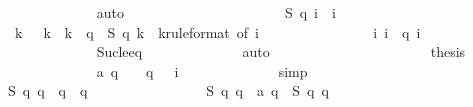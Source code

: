 \begin{isabellebody}
\ \ \ \ \ \ \ \ \ \ \ \ \isamarkupfalse%
\ auto\isanewline
\ \ \ \ \ \ \ \ \ \ \isamarkupfalse%
\isanewline
\ \ \ \ \ \ \ \ \ \ \isamarkupfalse%
\ {\isachardoublequoteopen}{\isacharquery}S\ q\ {\isacharparenleft}i{\isacharminus}{}{\isacharparenright}\ {\isacharequal}\ {\isacharparenleft}i{\isacharminus}{}{\isacharparenright}{\isachardoublequoteclose}\isanewline
\ \ \ \ \ \ \ \ \ \ \ \ \isamarkupfalse%
\ {\isacharbackquoteopen}{\isasymforall}\ k{\isachardot}\ {}\ {\isasymle}\ k\ {\isasymand}\ k\ {\isacharless}\ q\ {\isasymlongrightarrow}\ {\isacharquery}S\ q\ k\ {\isacharequal}\ k{\isacharbackquoteclose}{\isacharbrackleft}rule{\isacharunderscore}format{\isacharcomma}\ of\ {\isachardoublequoteopen}i{\isacharminus}{}{\isachardoublequoteclose}{\isacharbrackright}\isanewline
\ \ \ \ \ \ \ \ \ \ \ \ \isamarkupfalse%
\ {\isacharbackquoteopen}{}\ {\isasymle}\ i{\isacharbackquoteclose}\ {\isacharbackquoteopen}i\ {\isasymle}\ q{\isacharbackquoteclose}\ {\isacharbackquoteopen}i\ {\isasymnoteq}\ {}{\isacharbackquoteclose}\isanewline
\ \ \ \ \ \ \ \ \ \ \ \ \isamarkupfalse%
\ Suc{\isacharunderscore}le{\isacharunderscore}eq\isanewline
\ \ \ \ \ \ \ \ \ \ \ \ \isamarkupfalse%
\ auto\isanewline
\ \ \ \ \ \ \ \ \ \ \isamarkupfalse%
\isanewline
\ \ \ \ \ \ \ \ \ \ \isamarkupfalse%
\ {\isacharquery}thesis\isanewline
\ \ \ \ \ \ \ \ \ \ \ \ \isamarkupfalse%
\ {\isacharbackquoteopen}a\ q\ {\isacharequal}\ {}\ {\isacharminus}\ {}{\isacharslash}q{\isacharbackquoteclose}\ {\isacharbackquoteopen}{}\ {\isasymle}\ i{\isacharbackquoteclose}\isanewline
\ \ \ \ \ \ \ \ \ \ \ \ \isamarkupfalse%
\ simp\isanewline
\ \ \ \ \ \ \ \ \isamarkupfalse%
\isanewline
\ \ \ \ \ \ \isamarkupfalse%
\isanewline
\isanewline
\ \ \ \ \ \ \isamarkupfalse%
\ {\isachardoublequoteopen}{\isacharquery}S\ {\isacharparenleft}q{\isacharplus}{}{\isacharparenright}\ {\isacharparenleft}q{\isacharplus}{}{\isacharparenright}\ {\isacharequal}\ q\ {\isacharminus}\ {}{\isacharslash}q{\isachardoublequoteclose}\isanewline
\ \ \ \ \ \ \isamarkupfalse%
{\isacharminus}\isanewline
\ \ \ \ \ \ \ \ \isamarkupfalse%
\ {\isachardoublequoteopen}{\isacharquery}S\ {\isacharparenleft}q{\isacharplus}{}{\isacharparenright}\ {\isacharparenleft}q{\isacharplus}{}{\isacharparenright}\ {\isacharequal}\ a\ q\ {\isacharplus}\ {\isacharquery}S\ q\ q{\isachardoublequoteclose}\isanewline

\end{isabellebody}
